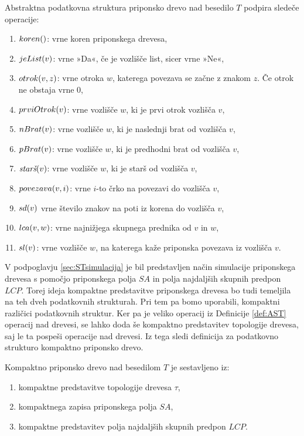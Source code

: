 \begin{defi}\label{def:AST}
    Abstraktna podatkovna struktura priponsko drevo nad besedilo $T$ podpira sledeče operacije:
    \newpage
    \begin{enumerate}
        \item $\Koren$: vrne koren priponskega drevesa,
        \item $\List{v}$: vrne »Da«, če je vozlišče list, sicer vrne »Ne«,
        \item $\Otrok{v}{z}$: vrne otroka $w$, katerega povezava se začne z znakom $z$. Če otrok ne obstaja vrne 0,
        \item $\PrviOtrok{v}$: vrne vozlišče $w$, ki je prvi otrok vozlišča $v$,
        \item $\NBrat{v}$: vrne vozlišče $w$, ki je naslednji brat od vozlišča $v$,
        \item $\PBrat{v}$: vrne vozlišče $w$, ki je predhodni brat od vozlišča $v$,
        \item $\Stars{v}$: vrne vozlišče $w$, ki je starš od vozlišča $v$,
        \item $\Povezava{v}{i}$: vrne $i$-to črko na povezavi do vozlišča $v$,
        \item $\Sd{v}$ vrne število znakov na poti iz korena do vozlišča $v$,
        \item $\Lca{v}{w}$: vrne najnižjega skupnega prednika od $v$ in $w$,
        \item $\Sl{v}$: vrne vozlišče $w$, na katerega kaže priponska povezava iz vozlišča $v$.
    \end{enumerate}
\end{defi}

V podpoglavju \ref{sec:STsimulacija} je bil predstavljen način simulacije priponskega drevesa s pomočjo priponskega polja $SA$ in polja najdaljših skupnih predpon $LCP$. Torej ideja kompaktne predstavitve priponskega drevesa bo tudi temeljila na teh dveh podatkovnih strukturah. Pri tem pa bomo uporabili, kompaktni različici podatkovnih struktur. Ker pa je veliko operacij iz Definicije \ref{def:AST} operacij nad drevesi, se lahko doda še kompaktno predstavitev topologije drevesa, saj le ta pospeši operacije nad drevesi. Iz tega sledi definicija za podatkovno strukturo kompaktno priponsko drevo.

\begin{defi}
    Kompaktno priponsko drevo nad besedilom $T$ je sestavljeno iz:
    \begin{enumerate}
        \item kompaktne predstavitve topologije drevesa $\tau$,
        \item kompaktnega zapisa priponskega polja $SA$, %
        \item kompaktne predstavitev polja najdaljših skupnih predpon $LCP$.
    \end{enumerate}
\end{defi}

